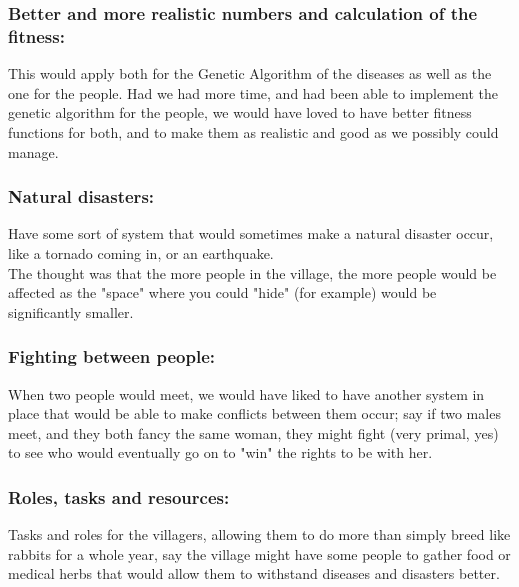 \documentclass[conference,compsoc]{IEEEtran}
\begin{document}
\subsubsection*{Better and more realistic numbers and calculation of the fitness:}
This would apply both for the Genetic Algorithm of the diseases as well as the one for the people. Had we had more time, and had been able to implement the genetic algorithm for the people, we would have loved to have better fitness functions for both, and to make them as realistic and good as we possibly could manage.\\

\subsubsection*{Natural disasters:}
Have some sort of system that would sometimes make a natural disaster occur, like a tornado coming in, or an earthquake.\\
The thought was that the more people in the village, the more people would be affected as the "space" where you could "hide" (for example) would be significantly smaller.\\

\subsubsection*{Fighting between people:}
When two people would meet, we would have liked to have another system in place that would be able to make conflicts between them occur; say if two males meet, and they both fancy the same woman, they might fight (very primal, yes) to see who would eventually go on to "win" the rights to be with her.\\

\subsubsection*{Roles, tasks and resources:}
Tasks and roles for the villagers, allowing them to do more than simply breed like rabbits for a whole year, say the village might have some people to gather food or medical herbs that would allow them to withstand diseases and disasters better.\\

\end{document}
